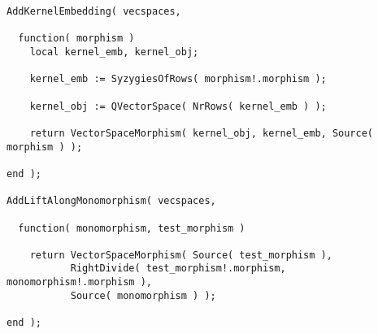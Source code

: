 \begin{small}
\begin{Verbatim}[frame=single]
AddKernelEmbedding( vecspaces,

  function( morphism )
    local kernel_emb, kernel_obj;
    
    kernel_emb := SyzygiesOfRows( morphism!.morphism );
    
    kernel_obj := QVectorSpace( NrRows( kernel_emb ) );
    
    return VectorSpaceMorphism( kernel_obj, kernel_emb, Source( morphism ) );
    
end );

AddLiftAlongMonomorphism( vecspaces,

  function( monomorphism, test_morphism )

    return VectorSpaceMorphism( Source( test_morphism ),
           RightDivide( test_morphism!.morphism, monomorphism!.morphism ),
           Source( monomorphism ) );

end );
\end{Verbatim}
\end{small}